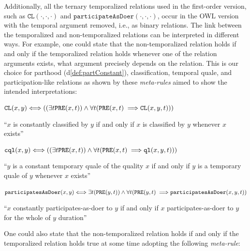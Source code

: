 \documentclass[sw]{iosart2x}
\newcommand{\bflist}{\begin{list}{}{\setlength{\topsep}{2mm}\setlength{\partopsep}{0mm}\setlength{\parsep}{0mm}\setlength{\leftmargin}{9mm}\setlength{\labelwidth}{8mm}}}
\newcommand{\eflist}{\end{list}}
\newcommand{\DefLabel}{\textrm{d}}
\newcounter{cntdef}
\newcommand{\mydf}[1]{\refstepcounter{cntdef}\begin{small}{\bf \DefLabel\thecntdef\label{def:#1}}\end{small}}
\newcommand{\mytext}[1]{``#1''}
\newcommand{\refdf}[1]{({\DefLabel}\ref{#1})}
\newcommand{\generalStyle}[1]{\texttt{#1}}
\newcommand{\biRel}[3]{\generalStyle{#1}(#2,#3)}
\newcommand{\triRel}[4]{\generalStyle{#1}(#2,#3,#4)}
\newcommand{\myiff}{\Longleftrightarrow}
\newcommand{\myfi}{\hspace{0.9mm} \Longrightarrow}
\newcommand{\OWL}{\textnormal{OWL}\xspace}
\newcommand{\DOLCEQualeDirect}[2]{\biRel{{cql}}{#1}{#2}}
\newcommand{\DOLCECLbyBinary}[2]{\biRel{CL}{#1}{#2}}
\newcommand{\DOLCECLby}[3]{\triRel{CL}{#1}{#2}{#3}}
\newcommand{\DOLCEPRE}[2]{\biRel{PRE}{#1}{#2}}
\newcommand{\participateAsDoer}[3]{\triRel{participatesAsDoer}{#1}{#2}{#3}}
\newcommand{\participateAsDoerBinary}[2]{\biRel{participatesAsDoer}{#1}{#2}}
\newcommand{\playAs}[3]{\triRel{playAs}{#1}{#2}{#3}}
\newcommand{\DOLCEQualeTer}[3]{\triRel{ql}{#1}{#2}{#3}}
\newcommand{\TODOinline}[1]{{%
}}
\newcommand{\myComment}[1]{{\unskip \ignorespaces}}
\begin{document}

Additionally, all the ternary temporalized relations used in the first-order version, such as $\DOLCECLby{\cdot}{\cdot}{\cdot}$ \myComment{, $\playAs{\cdot}{\cdot}{\cdot}$,} 
and $\hspace{0pt}\texttt{participateAsDoer}(\cdot,\cdot,\cdot)$, occur in the \OWL version with the temporal argument removed, i.e., as binary relations.
The link between the temporalized and non-temporalized relations can be interpreted in different ways. For example, one could state that the non-temporalized relation holds if and only if the temporalized relation holds whenever one of the relation arguments exists, what argument precisely depends on the relation. This is our choice for parthood \refdf{def:partConstant}, classification, temporal quale, and participation-like relations as shown by these \textit{meta-rules} aimed to show the intended interpretations: %
\bflist
\item[\mydf{CLnontemp}$_{meta}$] $ \DOLCECLbyBinary{x}{y} \myiff ((\exists t \DOLCEPRE{x}{t}) \land \forall t (\DOLCEPRE{x}{t} \myfi  \DOLCECLby{x}{y}{t}))$ 
\item \mytext{$x$ is constantly classified by $y$ if and only if $x$ is classified by $y$ whenever $x$ exists}
\item[\mydf{Qualenontemp}$_{meta}$] $ \DOLCEQualeDirect{x}{y} \myiff ((\exists t \DOLCEPRE{x}{t}) \land \forall t (\DOLCEPRE{x}{t} \myfi  \DOLCEQualeTer{x}{y}{t}))$ 
\item \mytext{$y$ is a constant temporary quale of the quality $x$ if and only if $y$ is a temporary quale of $y$ whenever $x$ exists}
\item[\mydf{participationDoerNonTemp}$_{meta}$] $ \participateAsDoerBinary{x}{y} \myiff \exists t (\DOLCEPRE{y}{t}) \land \forall t (\DOLCEPRE{y}{t} \myfi \participateAsDoer{x}{y}{t})$
\item \mytext{$x$ constantly participates-as-doer to $y$ if and only if $x$ participates-as-doer to $y$ for the whole of $y$ duration}
\eflist
One could also state that the non-temporalized relation holds if and only if the temporalized relation holds true at some time adopting the following \textit{meta-rule}:%
\end{document}
